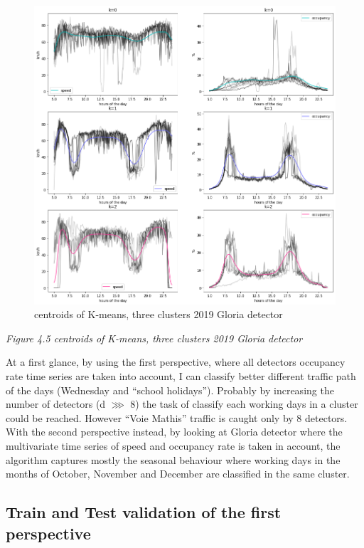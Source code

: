 \documentclass[11pt]{article}
\begin{document}
    \begin{figure}
    \centering
    \includegraphics{centroids softDTW 2019 K=3 gloria.png}
    \caption{centroids of K-means, three clusters 2019 Gloria detector}
    \label{fig:4.5}
\end{figure}

\emph{\small Figure 4.5 centroids of K-means, three clusters 2019 Gloria detector}

    At a first glance, by using the first perspective, where all detectors
occupancy rate time series are taken into account, I can classify better
different traffic path of the days (Wednesday and ``school holidays'').
Probably by increasing the number of detectors (d \(\ggg\) 8) the task
of classify each working days in a cluster could be reached. However
``Voie Mathis'' traffic is caught only by 8 detectors. With the second
perspective instead, by looking at Gloria detector where the
multivariate time series of speed and occupancy rate is taken in
account, the algorithm captures mostly the seasonal behaviour where
working days in the months of October, November and December are
classified in the same cluster.

    \subsection{Train and Test validation of the first perspective}
\end{document}
